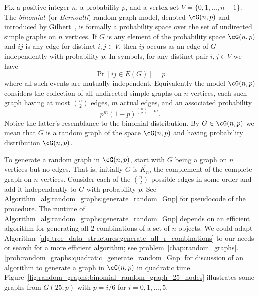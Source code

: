 Fix a positive integer $n$, a probability $p$, and a vertex set
$V = \{0, 1, \dots, n - 1\}$. The
\emph{binomial}~(or
\emph{Bernoulli}) random graph model,
denoted $\cG(n,p)$ and introduced by Gilbert~\cite{Gilbert1959}, is
formally a probability space over the set of
undirected simple graphs on $n$ vertices. If $G$ is any element of the
probability space $\cG(n,p)$ and $ij$ is any edge for distinct
$i,j \in V$, then $ij$ occurs as an edge of $G$ independently with
probability $p$. In symbols, for any distinct pair $i,j \in V$ we have
\[
\Pr[ij \in E(G)]
=
p
\]
where all such events are mutually independent. Equivalently the model
$\cG(n,p)$ considers the collection of all undirected simple graphs on
$n$ vertices, each such graph having at most $\binom{n}{2}$ edges, $m$
actual edges, and an associated probability
\begin{equation}
\label{eqn:random_graphs:probability_of_chosen_graph_binomial_model}
p^m (1 - p)^{\binom{n}{2} - m}.
\end{equation}
Notice the latter's resemblance to the
binomial distribution. By
$G \in \cG(n,p)$ we mean that $G$ is a random graph of the space
$\cG(n,p)$ and having probability
distribution $\cG(n,p)$.

To generate a random graph in $\cG(n,p)$, start with $G$ being a graph
on $n$ vertices but no edges. That is, initially $G$ is
$\overline{K_n}$, the complement of the complete
graph on $n$ vertices. Consider each of the $\binom{n}{2}$ possible
edges in some order and add it independently to $G$ with probability
$p$. See Algorithm~\ref{alg:random_graphs:generate_random_Gnp} for
pseudocode of the procedure. The runtime of
Algorithm~\ref{alg:random_graphs:generate_random_Gnp} depends on an
efficient algorithm for generating all $2$-combinations of a set of
$n$ objects. We could adapt
Algorithm~\ref{alg:tree_data_structures:generate_all_r_combinations}
to our needs or search for a more efficient algorithm; see
problem~\ref{chap:random_graphs}.\ref{prob:random_graphs:quadratic_generate_random_Gnp}
for discussion of an algorithm to generate a graph in $\cG(n,p)$ in
quadratic
time. Figure~\ref{fig:random_graphs:binomial_random_graph_25_nodes}
illustrates some graphs from $G(25,p)$ with $p = i/6$ for
$i = 0, 1, \dots, 5$.

